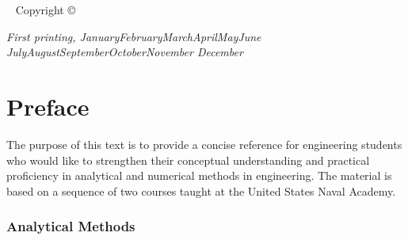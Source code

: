 \documentclass{tufte-book}
\theoremstyle{break}
\newcommand{\monthyear}{%
  \ifcase\month\or January\or February\or March\or April\or May\or June\or
  July\or August\or September\or October\or November\or
  December\fi\space\number\year
}
\begin{document}
\newpage
\begin{fullwidth}
~\vfill
\thispagestyle{empty}
\setlength{\parindent}{0pt}
\setlength{\parskip}{\baselineskip}
Copyright \copyright\ \the\year\ \thanklessauthor
\par{}

%

\par\textit{First printing, \monthyear}
\end{fullwidth}

\tableofcontents

\listoffigures

\listoftables



\cleardoublepage
\chapter*{Preface}

The purpose of this text is to provide a concise reference for engineering students who would like to strengthen their conceptual understanding and practical proficiency in analytical and numerical methods in engineering.  The material is based on a sequence of two courses taught at the United States Naval Academy.  

\subsection*{Analytical Methods}
\end{document}
